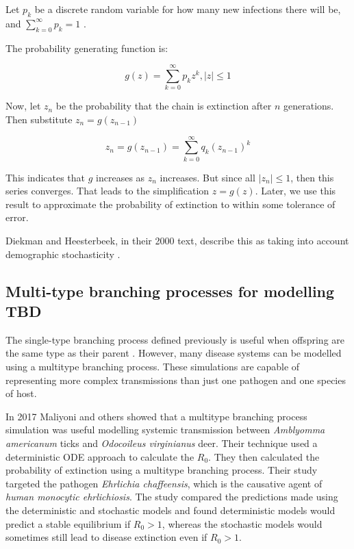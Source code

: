 \documentclass{article}
\begin{document}
Let $ p_k $ be a discrete random variable for how many new infections there will be, and $ \sum_{k=0}^\infty p_k =  1  $ \cite{Diekman2000}.

The probability generating function is:

\begin{equation}\label{BranchingProcess}
    g(z) = \sum_{k=0}^\infty p_k z^k, |z| \le 1
\end{equation}

Now, let $ z_n $ be the probability that the chain is extinction after $ n $ generations. Then substitute $ z_n = g(z_{n-1})$

\begin{equation}\label{BranchingProcess2}
    z_{n} = g(z_{n-1}) = \sum_{k=0}^\infty q_k (z_{n-1})^k
\end{equation}

This indicates that $ g $ increases as $ z_n $ increases. But since all $ |z_n| \le 1 $, then this series converges. That leads to the simplification $ z = g(z) $. Later, we use this result to approximate the probability of extinction to within some tolerance of error.

Diekman and Heesterbeek, in their 2000 text, describe this as taking into account demographic stochasticity \cite{Diekman2000}.

\subsection{Multi-type branching processes for modelling TBD}

The single-type branching process defined previously is useful when offspring are the same type as their parent \cite{Allen2019}. However, many disease systems can be modelled using a multitype branching process. These simulations are capable of representing more complex transmissions than just one pathogen and one species of host.

In 2017 Maliyoni and others showed that a multitype branching process simulation was useful modelling systemic transmission between \textit{Amblyomma americanum} ticks and \textit{Odocoileus virginianus} deer. Their technique used a deterministic ODE approach to calculate the $ R_0 $. They then calculated the probability of extinction using a multitype branching process. Their study targeted the pathogen \textit{Ehrlichia chaffeensis}, which is the causative agent of \textit{human monocytic ehrlichiosis}. The study compared the predictions made using the deterministic and stochastic models and found deterministic models would predict a stable equilibrium if $ R_0 > 1 $, whereas the stochastic models would sometimes still lead to disease extinction even if $ R_0 > 1 $.
\end{document}
